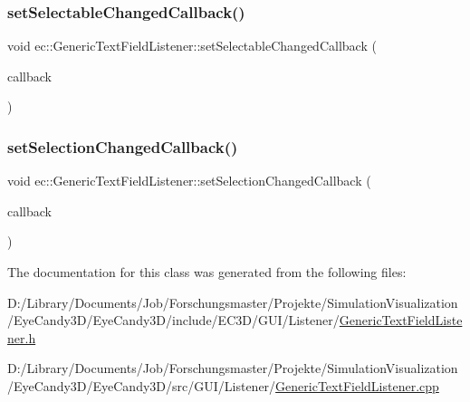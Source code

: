 \subsubsection{\texorpdfstring{set\+Selectable\+Changed\+Callback()}{setSelectableChangedCallback()}}
{\footnotesize\ttfamily void ec\+::\+Generic\+Text\+Field\+Listener\+::set\+Selectable\+Changed\+Callback (\begin{DoxyParamCaption}\item[{const \mbox{\hyperlink{classec_1_1_generic_text_field_listener_afa761f962b7fb681d7d9d29a132f800e}{Selectable\+Changed\+\_\+\+Callback}} \&}]{callback }\end{DoxyParamCaption})}

\mbox{\label{classec_1_1_generic_text_field_listener_aea5a7265627003b41e3a74744a1251d6}} 
\subsubsection{\texorpdfstring{set\+Selection\+Changed\+Callback()}{setSelectionChangedCallback()}}
{\footnotesize\ttfamily void ec\+::\+Generic\+Text\+Field\+Listener\+::set\+Selection\+Changed\+Callback (\begin{DoxyParamCaption}\item[{const \mbox{\hyperlink{classec_1_1_generic_text_field_listener_aa25985c5297422833dc4f5395562f238}{Selection\+Changed\+\_\+\+Callback}} \&}]{callback }\end{DoxyParamCaption})}



The documentation for this class was generated from the following files\+:\begin{DoxyCompactItemize}
\item 
D\+:/\+Library/\+Documents/\+Job/\+Forschungsmaster/\+Projekte/\+Simulation\+Visualization/\+Eye\+Candy3\+D/\+Eye\+Candy3\+D/include/\+E\+C3\+D/\+G\+U\+I/\+Listener/\mbox{\hyperlink{_generic_text_field_listener_8h}{Generic\+Text\+Field\+Listener.\+h}}\item 
D\+:/\+Library/\+Documents/\+Job/\+Forschungsmaster/\+Projekte/\+Simulation\+Visualization/\+Eye\+Candy3\+D/\+Eye\+Candy3\+D/src/\+G\+U\+I/\+Listener/\mbox{\hyperlink{_generic_text_field_listener_8cpp}{Generic\+Text\+Field\+Listener.\+cpp}}\end{DoxyCompactItemize}
